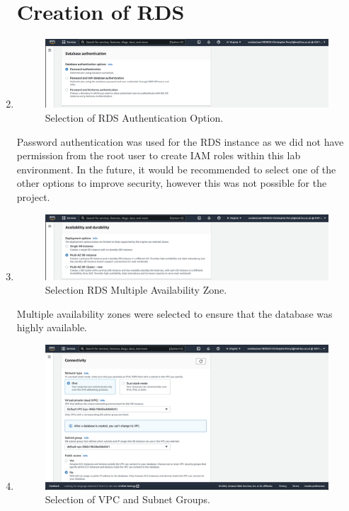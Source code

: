 \begin{enumerate}
    \section{Creation of RDS}\label{sec:creation-of-rds}

    \item
    \begin{figure}[H]
        \centering
        \includegraphics[width=\textwidth]{resources/rds/rds-authentication.png}
        \caption{Selection of RDS Authentication Option.}
        \label{fig:rds-auth}
    \end{figure}

    Password authentication was used for the RDS instance as we did not have permission from the root user to create IAM
    roles within this lab environment.
    In the future, it would be recommended to select one of the other options to improve security, however this was not
    possible for the project.

    \item
    \begin{figure}[H]
        \centering
        \includegraphics[width=\textwidth]{resources/rds/rds-availability-durability}
        \caption{Selection RDS Multiple Availability Zone.}
        \label{fig:rds-avail}
    \end{figure}

    Multiple availability zones were selected to ensure that the database was highly available.

    \item
    \begin{figure}[H]
        \centering
        \includegraphics[width=\textwidth]{resources/rds/rds-connectivity-1}
        \caption{Selection of VPC and Subnet Groups.}
        \label{fig:rds-connecting}
    \end{figure}


\end{enumerate}
